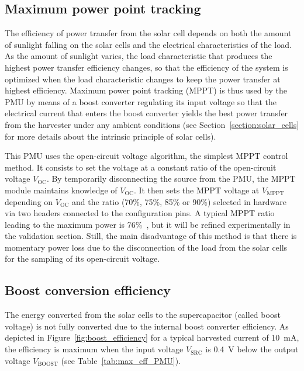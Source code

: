 \documentclass{EPL-master-thesis-covers-EN}
\newcommand{\te}[1]{\textrm{#1}}
\begin{document}
\subsection*{Maximum power point tracking}

The efficiency of power transfer from the solar cell depends on both the amount of sunlight falling on the solar cells and the electrical characteristics of the load. As the amount of sunlight varies, the load characteristic that produces the highest power transfer efficiency changes, so that the efficiency of the system is optimized when the load characteristic changes to keep the power transfer at highest efficiency. 
Maximum power point tracking (MPPT) is thus used by the PMU by means of a boost converter regulating its input voltage so that the electrical current that enters the boost converter yields the best power transfer from the harvester under any ambient conditions (see Section~\ref{section:solar_cells} for more details about the intrinsic principle of solar cells).

This PMU uses the open-circuit voltage algorithm, the simplest MPPT control method. It consists to set the voltage at a constant ratio of the open-circuit voltage $V_\te{OC}$. By temporarily disconnecting the source from the PMU, the MPPT module maintains knowledge of $V_\te{OC}$. It then sets the MPPT voltage at $V_\te{MPPT}$ depending on $V_\te{OC}$ and the ratio (70\%, 75\%, 85\% or 90\%) selected in hardware via two headers connected to the configuration pins. A typical MPPT ratio leading to the maximum power is 76\%~\cite{10.1109/ICSTE.2010.5608868}, but it will be refined experimentally in the validation section. Still, the main disadvantage of this method is that there is momentary power loss due to the disconnection of the load from the solar cells for the sampling of its open-circuit voltage.


\subsection*{Boost conversion efficiency}

The energy converted from the solar cells to the supercapacitor (called boost voltage) is not fully converted due to the internal boost converter efficiency. As depicted in Figure~\ref{fig:boost_efficiency} for a typical harvested current of \SI{10}{mA}, the efficiency is maximum when the input voltage $V_\te{SRC}$ is \SI{0.4}{V} below the output voltage $V_\te{BOOST}$ (see Table~\ref{tab:max_eff_PMU}).
\end{document}
